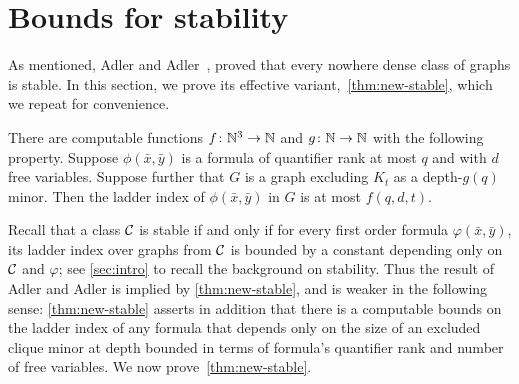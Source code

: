 
\section{Bounds for stability}\label{sec:stable}
As mentioned, Adler and Adler~\cite{adler2014interpreting}, 
proved that every nowhere dense class of graphs is stable. In this section,
we prove its effective variant,~\cref{thm:new-stable}, which 
we repeat for convenience.

\setcounter{aux}{\thetheorem}
\setcounter{theorem}{\thestable}
\begin{theorem}
There are computable functions $f\colon \N^3\to\N$ and $g\colon\N\to\N$ with the following property.
Suppose $\phi(\bar x,\bar y)$ is a formula of quantifier rank at most $q$ and with $d$ free variables.
Suppose further that $G$ is a graph excluding $K_t$ as a depth-$g(q)$ minor. Then the ladder index of $\phi(\bar x,\bar y)$ in $G$ is at most $f(q,d,t)$.
\end{theorem}
\setcounter{theorem}{\theaux}

Recall that a class $\cal C$ is stable if and only if for every first order formula $\varphi(\bar x,\bar y)$, 
its ladder index over graphs from $\cal C$ is bounded by a constant depending only on $\cal C$ and $\varphi$;
see \cref{sec:intro} to recall the background on stability.
Thus the result of Adler and Adler is implied by \cref{thm:new-stable},
and is weaker in the following sense: \cref{thm:new-stable} asserts in addition that there is a computable bounds on the ladder index
of any formula that depends only on the size of an excluded clique minor at depth bounded in terms of formula's quantifier rank and number of free variables. 
We now prove~\cref{thm:new-stable}.

